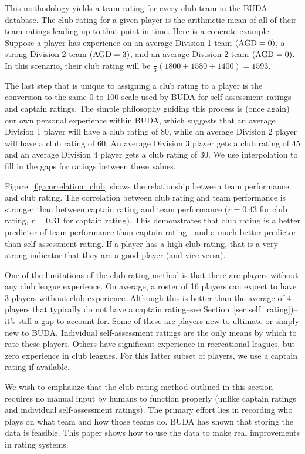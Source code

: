 This methodology yields a team rating for every club team in the BUDA database. The club rating for a given player is the arithmetic mean of all of their team ratings leading up to that point in time. Here is a concrete example. Suppose a player has experience on an average Division 1 team $({\rm AGD} = 0)$, a strong Division 2 team $({\rm AGD} = 3)$, and an average Division 2 team $({\rm AGD} = 0)$. In this scenario, their club rating will be $\frac{1}{3}(1800 + 1580 + 1400) = 1593$.

The last step that is unique to assigning a club rating to a player is the conversion to the same 0 to 100 scale used by BUDA for self-assessment ratings and captain ratings. The simple philosophy guiding this process is (once again) our own personal experience within BUDA, which suggests that an average Division 1 player will have a club rating of 80, while an average Division 2 player will have a club rating of 60. An average Division 3 player gets a club rating of 45 and an average Division 4 player gets a club rating of 30. We use interpolation to fill in the gaps for ratings between these values.

Figure~\ref{fig:correlation_club} shows the relationship between team performance and club rating. The correlation between club rating and team performance is stronger than between captain rating and team performance ($r = 0.43$ for club rating, $r = 0.31$ for captain rating). This demonstrates that club rating is a better predictor of team performance than captain rating---and a much better predictor than self-assessment rating. If a player has a high club rating, that is a very strong indicator that they are a good player (and vice versa).

One of the limitations of the club rating method is that there are players without any club league experience.  On average, a roster of 16 players can expect to have 3 players without club experience. Although this is better than the average of 4 players that typically do not have a captain rating--see Section~\ref{sec:self_rating})--it's still a gap to account for. Some of these are players new to ultimate or simply new to BUDA. Individual self-assessment ratings are the only means by which to rate these players. Others have significant experience in recreational leagues, but zero experience in club leagues. For this latter subset of players, we use a captain rating if available. 

We wish to emphasize that the club rating method outlined in this section requires no manual input by humans to function properly (unlike captain ratings and individual self-assessment ratings).  The primary effort lies in recording who plays on what team and how those teams do.  BUDA has shown that storing the data is feasible. This paper shows how to use the data to make real improvements in rating systems.

